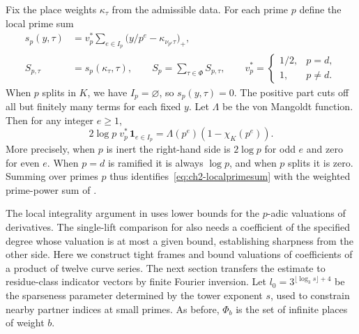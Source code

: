 Fix the place weights $\kappa_\tau$ from the admissible data. For each prime $p$ define the local prime sum
\begin{equation}
\label{eq:ch2-localprimesum}
\begin{aligned}
 s_p(y,\tau)&=v_p^*\sum_{e\in I_p}
      \bigl(y/p^e-\kappa_{\nu_{p^e}\tau}\bigr)_+,\\
 S_{p,\tau}&=s_p(\kappa_\tau,\tau),\qquad
 S_p=\sum_{\tau\in\Phi}S_{p,\tau},\qquad
 v_p^*=\begin{cases}1/2,&p=d,\\1,&p\ne d.\end{cases}
\end{aligned}
\end{equation}
When $p$ splits in $K$, we have $I_p=\varnothing$, so $s_p(y,\tau)=0$. The positive part cuts off all but finitely many terms for each fixed $y$. Let $\Lambda$ be the von Mangoldt function. Then for any integer $e\ge1$,
\begin{equation}
\label{eq:ch2-weighted-primes}
 2\log p\;v_p^*\,\mathbf1_{e\in I_p}
 =\Lambda(p^e)(1-\chi_K(p^e)).
\end{equation}
More precisely, when $p$ is inert the right-hand side is $2\log p$ for odd $e$ and zero for even $e$. When $p=d$ is ramified it is always $\log p$, and when $p$ splits it is zero. Summing over primes $p$ thus identifies~\eqref{eq:ch2-localprimesum} with the weighted prime-power sum of .

The local integrality argument in  uses lower bounds for the $p$-adic valuations of derivatives. The single-lift comparison for  also needs a coefficient of the specified degree whose valuation is at most a given bound, establishing sharpness from the other side. Here we construct tight frames and bound valuations of coefficients of a product of twelve curve series. The next section transfers the estimate to residue-class indicator vectors by finite Fourier inversion. Let $l_0=3^{\lfloor\log_3 s\rfloor+4}$ be the sparseness parameter determined by the tower exponent $s$, used to constrain nearby partner indices at small primes. As before, $\Phi_b$ is the set of infinite places of weight $b$.

